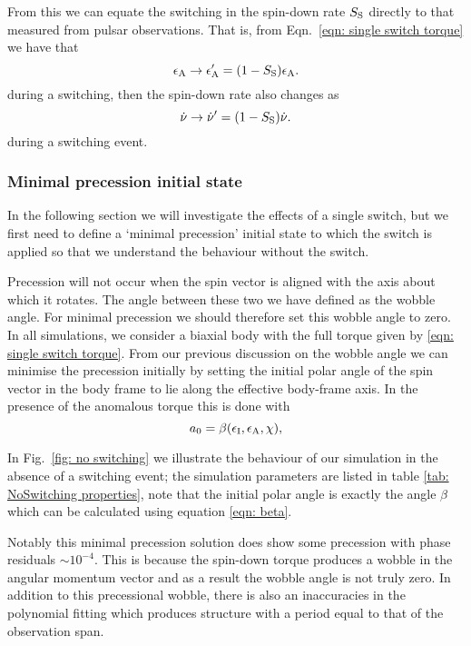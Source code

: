 \documentclass[../full_thesis/full_thesis.tex]{subfiles}
\newcommand{\thisdir}{../inertial_frame}
\begin{document}
From this we can equate the switching in the spin-down rate $S_{\mathrm{S}}$ directly to
that measured from pulsar observations. That is, from Eqn.~\eqref{eqn: single switch torque}
we have that
\begin{equation}
    \epsilon_{\mathrm{A}} \rightarrow \epsilon_{\mathrm{A}}' = (1-S_{\mathrm{S}})\epsilon_{\mathrm{A}}.
\label{eqn: epsA switch}
\end{equation}
during a switching, then the spin-down rate also changes as
\begin{equation}
    \dot{\nu} \rightarrow \dot{\nu}' = (1-S_{\mathrm{S}})\dot{\nu}.
\label{eqn: nudot switch}
\end{equation}
during a switching event.


\subsubsection{Minimal precession initial state}
In the following section we will investigate the effects of a single switch, but
we first need to define a `minimal precession' initial state to which the
switch is applied so that we understand the behaviour without the switch.

Precession will not occur when the spin vector is aligned with the axis about
which it rotates. The angle between these two we have defined as the wobble
angle.  For minimal precession we should therefore set this wobble angle to
zero. In all simulations, we consider a biaxial body with the full torque given
by \eqref{eqn: single switch torque}. From our previous discussion on the
wobble angle we can minimise the precession initially by setting the initial polar angle
of the spin vector in the body frame to lie along the effective body-frame
axis. In the presence of the anomalous torque this is done with
\begin{equation}
a_{0} = \beta(\epsilon_{\mathrm{I}}, \epsilon_{\mathrm{A}}, \chi),
\end{equation}

In Fig.~\ref{fig: no switching} we illustrate the behaviour of our simulation
in the absence of a switching event; the simulation parameters are listed in
table \ref{tab: NoSwitching properties}, note that the initial polar angle is
exactly the angle $\beta$ which can be calculated using equation \eqref{eqn:
beta}.
\begin{figure}[htb]
\begin{floatrow}
\capbtabbox{%
  
}{%
  \caption{}%
  \label{tab: NoSwitching properties}
}
\end{floatrow}
\end{figure}
Notably this minimal precession solution does show some precession with phase
residuals $\sim 10^{-4}$. This is because the spin-down torque produces a wobble
in the angular momentum vector and as a result the wobble angle is not truly
zero. In addition to this precessional wobble, there is also an inaccuracies
in the polynomial fitting which produces structure with a period equal to that
of the observation span.
\end{document}
